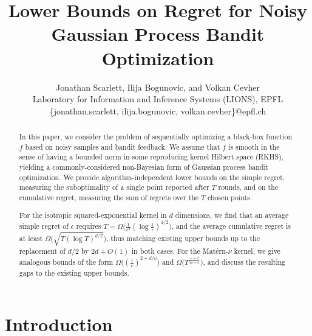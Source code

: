 \documentclass[english,onecolumn,final,11pt]{IEEEtran} %
\title{Lower Bounds on Regret for Noisy\\ Gaussian Process Bandit Optimization}
\author{Jonathan Scarlett, Ilija Bogunovic, and Volkan Cevher \\ [3mm]
    \small Laboratory for Information and Inference Systems (LIONS), EPFL \\
    \{jonathan.scarlett, ilija.bogunovic, volkan.cevher\}@epfl.ch}
\begin{document}
\maketitle

\begin{abstract}
    In this paper, we consider the problem of sequentially optimizing a black-box function $f$ based on noisy samples and bandit feedback.  We assume that $f$ is smooth in the sense of having a bounded norm in some reproducing kernel Hilbert space (RKHS), yielding a commonly-considered non-Bayesian form of Gaussian process bandit optimization.  We provide algorithm-independent lower bounds on the simple regret, measuring the suboptimality of a single point reported after $T$ rounds, and on the cumulative regret, measuring the sum of regrets over the $T$ chosen points.  
    
    For the isotropic squared-exponential kernel in $d$ dimensions, we find that an average simple regret of $\epsilon$ requires $T = \Omega\big(\frac{1}{\epsilon^2} (\log\frac{1}{\epsilon})^{d/2}\big)$, and the average cumulative regret is at least $\Omega\big( \sqrt{T(\log T)^{d/2}} \big)$, thus matching existing upper bounds up to the replacement of $d/2$ by $2d+O(1)$ in both cases.  For the Mat\'ern-$\nu$ kernel, we give analogous bounds of the form $\Omega\big( (\frac{1}{\epsilon})^{2+d/\nu}\big)$ and $\Omega\big( T^{\frac{\nu + d}{2\nu + d}} \big)$, and discuss the resulting gaps to the existing upper bounds.
\end{abstract}



%
%

\section{Introduction}
\end{document}
